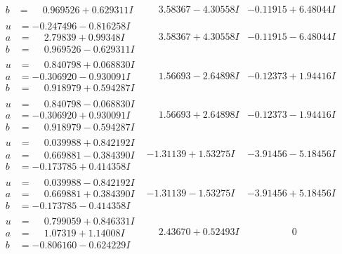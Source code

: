 \documentclass[1p]{elsarticle_modified}
\theoremstyle{definition}
\begin{document}
$$\begin{array}{c|c|c}
\begin{aligned}
b &= \phantom{-}0.969526 + 0.629311 I\end{aligned}
 & \phantom{-}3.58367 - 4.30558 I & -0.11915 + 6.48044 I \\ \hline\begin{aligned}
u &= -0.247496 - 0.816258 I \\
a &= \phantom{-}2.79839 + 0.99348 I \\
b &= \phantom{-}0.969526 - 0.629311 I\end{aligned}
 & \phantom{-}3.58367 + 4.30558 I & -0.11915 - 6.48044 I \\ \hline\begin{aligned}
u &= \phantom{-}0.840798 + 0.068830 I \\
a &= -0.306920 - 0.930091 I \\
b &= \phantom{-}0.918979 + 0.594287 I\end{aligned}
 & \phantom{-}1.56693 - 2.64898 I & -0.12373 + 1.94416 I \\ \hline\begin{aligned}
u &= \phantom{-}0.840798 - 0.068830 I \\
a &= -0.306920 + 0.930091 I \\
b &= \phantom{-}0.918979 - 0.594287 I\end{aligned}
 & \phantom{-}1.56693 + 2.64898 I & -0.12373 - 1.94416 I \\ \hline\begin{aligned}
u &= \phantom{-}0.039988 + 0.842192 I \\
a &= \phantom{-}0.669881 - 0.384390 I \\
b &= -0.173785 + 0.414358 I\end{aligned}
 & -1.31139 + 1.53275 I & -3.91456 - 5.18456 I \\ \hline\begin{aligned}
u &= \phantom{-}0.039988 - 0.842192 I \\
a &= \phantom{-}0.669881 + 0.384390 I \\
b &= -0.173785 - 0.414358 I\end{aligned}
 & -1.31139 - 1.53275 I & -3.91456 + 5.18456 I \\ \hline\begin{aligned}
u &= \phantom{-}0.799059 + 0.846331 I \\
a &= \phantom{-}1.07319 + 1.14008 I \\
b &= -0.806160 - 0.624229 I\end{aligned}
 & \phantom{-}2.43670 + 0.52493 I & \phantom{-0.000000 } 0 \\ \hline\begin{aligned}

\end{aligned}
\end{array}$$
\end{document}
